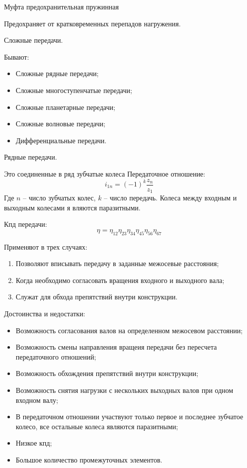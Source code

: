 \documentclass{article}
\begin{document}
Муфта предохранительная пружинная

Предохраняет от кратковременных перепадов нагружения.

Сложные передачи.

Бывают:
\begin{itemize}
	\item Сложные рядные передачи;
	\item Сложные многоступенчатые передачи;
	\item Сложные планетарные передачи;
	\item Сложные волновые передачи;
	\item Дифференциальные передачи.
\end{itemize}

Рядные передачи.

Это соединенные в ряд зубчатые колеса
Передаточное отношение:
$$
i_{1n} = (-1)^k \frac{z_{n}}{z_1} 
$$
Где $n$ -- число зубчатых колес, $k$ -- число передачь.
Колеса между входным и выходным колесами я вляются паразитными.

Кпд передачи:
$$
\eta = \eta_{12} \eta_{23} \eta_{34} \eta_{45} \eta_{56} \eta_{67}
$$

Применяют в трех случаях:
\begin{enumerate}
	\item Позволяют вписывать передачу в заданные межосевые расстояния;
	\item Когда необходимо согласовать вращения входного и выходного вала;
	\item Служат для обхода препятствий внутри конструкции.
\end{enumerate}

Достоинства и недостатки:
\begin{itemize}
	\item Возможность согласования валов на определенном межосевом расстоянии;
	\item Возможность смены направления вращеия передачи без пересчета передаточного отношений;
	\item Возможность обхождения препятствий внутри конструкции;
	\item Возможность снятия нагрузки с нескольких выходных валов при одном входном валу;
	\item В передаточном отношении участвуют только первое и последнее зубчатое колесо, все остальные колеса являются паразитными;
	\item Низкое кпд;
	\item Большое количество промежуточных элементов.
\end{itemize}
\end{document}
